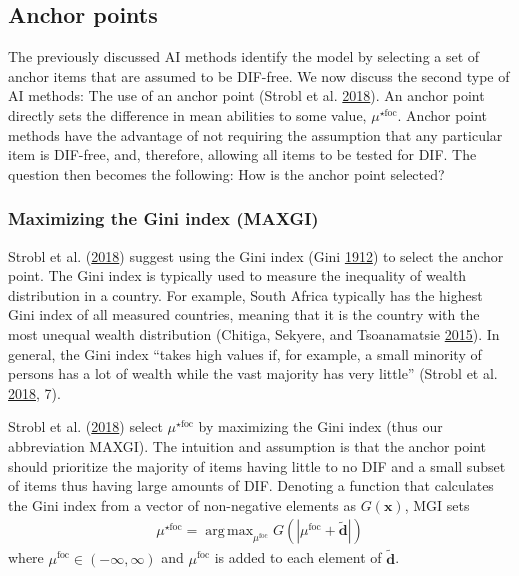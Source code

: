 \documentclass[
  11pt,
]{article}
\begin{document}
\hypertarget{anchor-points}{%
\subsection{Anchor points}\label{anchor-points}}

The previously discussed AI methods identify the model by selecting a set of anchor items that are assumed to be DIF-free. We now discuss the second type of AI methods: The use of an anchor point (Strobl et al. \protect\hyperlink{ref-strobl2018anchor}{2018}). An anchor point directly sets the difference in mean abilities to some value, \(\mu^{\star\text{foc}}\). Anchor point methods have the advantage of not requiring the assumption that any particular item is DIF-free, and, therefore, allowing all items to be tested for DIF. The question then becomes the following: How is the anchor point selected?

\hypertarget{maximizing-the-gini-index-maxgi}{%
\subsubsection{Maximizing the Gini index (MAXGI)}\label{maximizing-the-gini-index-maxgi}}

Strobl et al. (\protect\hyperlink{ref-strobl2018anchor}{2018}) suggest using the Gini index (Gini \protect\hyperlink{ref-gini1912variabilita}{1912}) to select the anchor point. The Gini index is typically used to measure the inequality of wealth distribution in a country. For example, South Africa typically has the highest Gini index of all measured countries, meaning that it is the country with the most unequal wealth distribution (Chitiga, Sekyere, and Tsoanamatsie \protect\hyperlink{ref-chitiga2015income}{2015}). In general, the Gini index \enquote{takes high values if, for example, a small minority of persons has a lot of wealth while the vast majority has very little} (Strobl et al. \protect\hyperlink{ref-strobl2018anchor}{2018}, 7).

Strobl et al. (\protect\hyperlink{ref-strobl2018anchor}{2018}) select \(\mu^{\star\text{foc}}\) by maximizing the Gini index (thus our abbreviation MAXGI). The intuition and assumption is that the anchor point should prioritize the majority of items having little to no DIF and a small subset of items thus having large amounts of DIF. Denoting a function that calculates the Gini index from a vector of non-negative elements as \(G(\mathbf{x})\), MGI sets
\begin{align}
\mu^{\star\text{foc}} = \mathop\mathrm{arg\,max}_{\mu^\text{foc}} G(|\mu^\text{foc} + \tilde{\mathbf{d}}|)
\end{align}
where \(\mu^\text{foc} \in (-\infty, \infty)\) and \(\mu^\text{foc}\) is added to each element of \(\tilde{\mathbf{d}}\).
\end{document}
